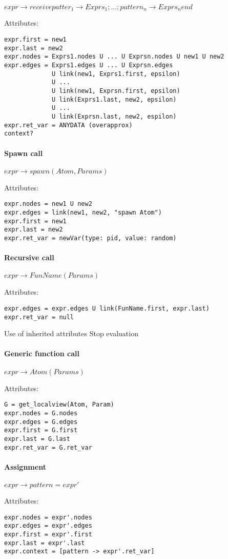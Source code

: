 $expr \to receive patter_1 \to Exprs_1; ...; pattern_n \to Exprs_n end$

Attributes:
\begin{verbatim}
expr.first = new1
expr.last = new2
expr.nodes = Exprs1.nodes U ... U Exprsn.nodes U new1 U new2
expr.edges = Exprs1.edges U ... U Exprsn.edges
             U link(new1, Exprs1.first, epsilon) 
             U ...
             U link(new1, Exprsn.first, epsilon)
             U link(Exprs1.last, new2, epsilon)
             U ...
             U link(Exprsn.last, new2, espilon)
expr.ret_var = ANYDATA (overapprox)
context?
\end{verbatim}

\paragraph{Spawn call}

$expr \to spawn(Atom, Params)$

Attributes:
\begin{verbatim}
expr.nodes = new1 U new2
expr.edges = link(new1, new2, "spawn Atom")
expr.first = new1
expr.last = new2
expr.ret_var = newVar(type: pid, value: random) 
\end{verbatim}

\paragraph{Recursive call}

$expr \to FunName(Params)$

Attributes:
\begin{verbatim}
expr.edges = expr.edges U link(FunName.first, expr.last)
expr.ret_var = null
\end{verbatim}

Use of inherited attributes
Stop evaluation

\paragraph{Generic function call} 

$expr \to Atom(Params)$

Attributes:
\begin{verbatim}
G = get_localview(Atom, Param)
expr.nodes = G.nodes
expr.edges = G.edges
expr.first = G.first
expr.last = G.last
expr.ret_var = G.ret_var 
\end{verbatim}

\paragraph{Assignment}

$expr \to pattern = expr'$

Attributes:
\begin{verbatim}
expr.nodes = expr'.nodes
expr.edges = expr'.edges
expr.first = expr'.first
expr.last = expr'.last
expr.context = [pattern -> expr'.ret_var]
\end{verbatim}
